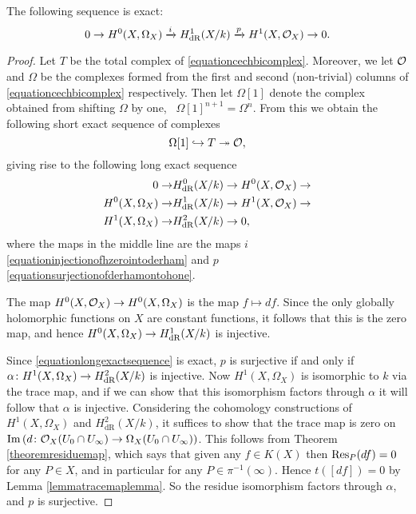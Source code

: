     \begin{prop}\label{propshortexactsequence}
    The following sequence is exact:
        \begin{equation*}
        0 \rightarrow H^0(X,\Omega_X) \xrightarrow{i} H_{\text {dR}}^1(X/k) \xrightarrow{p} H^1(X,{\cal O}_X) \rightarrow 0.
        \end{equation*}
    \end{prop}
    \begin{proof}
    Let $T$ be the total complex of \eqref{equationcechbicomplex}.
    Moreover, we let ${\cal O}$ and $\Omega$ be the complexes formed from the first and second (non-trivial) columns of \eqref{equationcechbicomplex} respectively.
    Then let $\Omega[1]$ denote the complex obtained from shifting $\Omega$ by one, \ie~$\Omega[1]^{n+1} = \Omega^n$.
    From this we obtain the following short exact sequence of complexes 
        \[
        \Omega[1] \hookrightarrow T \twoheadrightarrow {\cal O},
        \]
    giving rise to the following long exact sequence
        \begin{align} \label{equationlongexactsequence}
        \begin{split}
        0 \rightarrow & H^0_{\text {dR}}(X/k) \rightarrow   H^0(X,{\cal O}_X) \rightarrow \\ 
        H^0(X,\Omega_X) \rightarrow & H_{\text {dR}}^1(X/k) \rightarrow   H^1(X,\mathcal{O}_X) \rightarrow  \\
        H^1(X,\Omega_X) \rightarrow & H^2_{\text {dR}}(X/k) \rightarrow   0, 
        \end{split}
        \end{align} 
    where the maps in the middle line are the maps $i$ \eqref{equationinjectionofhzerointoderham} and $p$ \eqref{equationsurjectionofderhamontohone}.


    The map $H^0(X,{\cal O}_X) \rightarrow {H^0(X,\Omega_X)}$ is the map $f \mapsto df$.
    Since the only globally holomorphic functions on $X$ are constant functions, it follows that this is the zero map, and hence ${H^0(X,\Omega_X)} \rightarrow H_{\text {dR}}^1(X/k)$ is injective.
    
    Since \eqref{equationlongexactsequence} is exact, $p$ is surjective if and only if $\alpha \colon H^1(X,\Omega_X) \rightarrow H^2_{\text {dR}}(X/k)$ is injective.
    Now $H^1(X,\Omega_X)$ is isomorphic to $k$ via the trace map, and if we can show that this isomorphism factors through $\alpha$ it will follow that $\alpha$ is injective.
    Considering the \cech cohomology constructions of $H^1(X,\Omega_X)$ and $H^2_{\text {dR}}(X/k)$, it suffices to show that the trace map is zero on $\operatorname{Im} \left( d \colon {\cal O}_X(U_0 \cap U_\infty) \rightarrow \Omega_X(U_0 \cap U_\infty) \right)$.
    This follows from Theorem \ref{theoremresiduemap}, which says that given any $f \in K(X)$ then $\operatorname{Res}_P(df)=0$ for any $P \in X$, and in particular for any $P \in \pi^{-1}(\infty)$.
    Hence $t\left([df]\right) = 0$ by Lemma \ref{lemmatracemaplemma}.
    So the residue isomorphism factors through $\alpha$, and $p$ is surjective.
    \end{proof}

